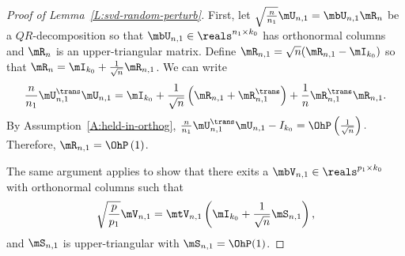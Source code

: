 \begin{proof}[Proof of Lemma~\ref{L:svd-random-perturb}]
    First, let $\sqrt{\frac{n}{n_1}} \mU_{n,1} = \mbU_{n,1} \mR_n$ be a 
    $QR$-decomposition so that $\mbU_{n,1} \in \reals^{n_1 \times k_0}$ has
    orthonormal columns and $\mR_n$ is an upper-triangular matrix.  Define
    $\mR_{n,1} = \sqrt{n} ( \mR_{n,1} - \mI_{k_0})$ so that
    $\mR_n = \mI_{k_0} + \frac{1}{\sqrt{n}} \mR_{n,1}$.  We can write
    \[
        \frac{n}{n_1}
        \mU_{n,1}^\trans \mU_{n,1}
            =
                \mI_{k_0}
                +
                \frac{1}{\sqrt{n}}
                \left(
                    \mR_{n,1}
                    +
                    \mR_{n,1}^\trans
                \right)
                +
                \frac{1}{n}
                \mR_{n,1}^\trans \mR_{n,1}.
    \]
    By Assumption~\ref{A:held-in-orthog},
    \(
        \frac{n}{n_1} \mU_{n,1}^\trans \mU_{n,1}
        -
        I_{k_0}
        =
        \OhP\left( \frac{1}{\sqrt{n}} \right).
    \)
    Therefore, $\mR_{n,1} = \OhP\left( 1 \right)$.
    
    The same argument applies to show that there exits a
    $\mbV_{n,1} \in \reals^{p_1 \times k_0}$ with orthonormal columns
    such that
    \[
        \sqrt{\frac{p}{p_1}} \mV_{n,1} 
            =
            \mtV_{n,1}
            \left(
                \mI_{k_0}
                +
                \frac{1}{\sqrt{n}}
                \mS_{n,1}
            \right),
    \]
    and $\mS_{n,1}$ is upper-triangular with $\mS_{n,1} = \OhP(1)$.
    

\end{proof}
